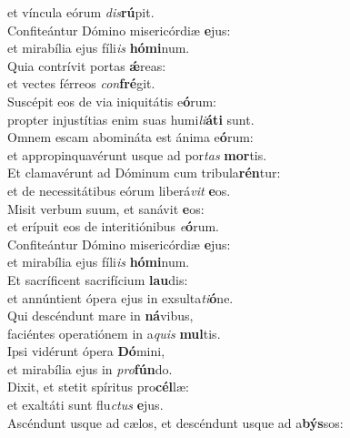 \evenverse et víncula eórum \textit{dis}\textbf{rú}pit.\\
\oddverse Confiteántur Dómino misericórdiæ \textbf{e}jus:~\*\\
\oddverse et mirabília ejus fíli\textit{is} \textbf{hó}\textbf{mi}num.\\
\evenverse Quia contrívit portas \textbf{ǽ}reas:~\*\\
\evenverse et vectes férreos \textit{con}\textbf{fré}git.\\
\oddverse Suscépit eos de via iniquitátis e\textbf{ó}rum:~\*\\
\oddverse propter injustítias enim suas humi\textit{li}\textbf{á}\textbf{ti} sunt.\\
\evenverse Omnem escam abomináta est ánima e\textbf{ó}rum:~\*\\
\evenverse et appropinquavérunt usque ad por\textit{tas} \textbf{mor}tis.\\
\oddverse Et clamavérunt ad Dóminum cum tribula\textbf{rén}tur:~\*\\
\oddverse et de necessitátibus eórum liberá\textit{vit} \textbf{e}os.\\
\evenverse Misit verbum suum, et sanávit \textbf{e}os:~\*\\
\evenverse et erípuit eos de interitiónibus \textit{e}\textbf{ó}rum.\\
\oddverse Confiteántur Dómino misericórdiæ \textbf{e}jus:~\*\\
\oddverse et mirabília ejus fíli\textit{is} \textbf{hó}\textbf{mi}num.\\
\evenverse Et sacríficent sacrifícium \textbf{lau}dis:~\*\\
\evenverse et annúntient ópera ejus in exsulta\textit{ti}\textbf{ó}ne.\\
\oddverse Qui descéndunt mare in \textbf{ná}vibus,~\*\\
\oddverse faciéntes operatiónem in a\textit{quis} \textbf{mul}tis.\\
\evenverse Ipsi vidérunt ópera \textbf{Dó}mini,~\*\\
\evenverse et mirabília ejus in \textit{pro}\textbf{fún}do.\\
\oddverse Dixit, et stetit spíritus pro\textbf{cél}læ:~\*\\
\oddverse et exaltáti sunt flu\textit{ctus} \textbf{e}jus.\\
\evenverse Ascéndunt usque ad cælos, et descéndunt usque ad a\textbf{býs}sos:~\*\\
